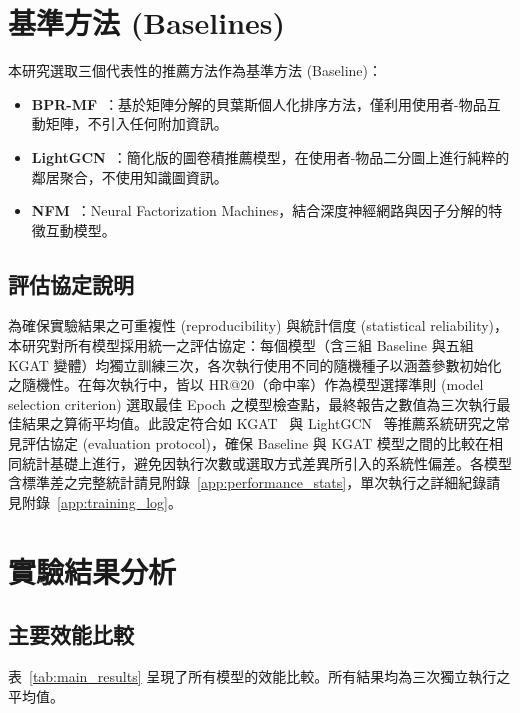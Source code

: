 \section{基準方法 (Baselines)}

本研究選取三個代表性的推薦方法作為基準方法 (Baseline)：

\begin{itemize}[leftmargin=2em]
  \item \textbf{BPR-MF}~\cite{rendle2009bpr}：基於矩陣分解的貝葉斯個人化排序方法，僅利用使用者-物品互動矩陣，不引入任何附加資訊。
  \item \textbf{LightGCN}~\cite{he2020lightgcn}：簡化版的圖卷積推薦模型，在使用者-物品二分圖上進行純粹的鄰居聚合，不使用知識圖資訊。
  \item \textbf{NFM}~\cite{he2017nfm}：Neural Factorization Machines，結合深度神經網路與因子分解的特徵互動模型。
\end{itemize}

\subsection*{評估協定說明}

為確保實驗結果之可重複性 (reproducibility) 與統計信度 (statistical reliability)，本研究對所有模型採用統一之評估協定：每個模型（含三組 Baseline 與五組 KGAT 變體）均獨立訓練三次，各次執行使用不同的隨機種子以涵蓋參數初始化之隨機性。在每次執行中，皆以 HR@20（命中率）作為模型選擇準則 (model selection criterion) 選取最佳 Epoch 之模型檢查點，最終報告之數值為三次執行最佳結果之算術平均值。此設定符合如 KGAT~\cite{wang2019kgat} 與 LightGCN~\cite{he2020lightgcn} 等推薦系統研究之常見評估協定 (evaluation protocol)，確保 Baseline 與 KGAT 模型之間的比較在相同統計基礎上進行，避免因執行次數或選取方式差異所引入的系統性偏差。各模型含標準差之完整統計請見附錄~\ref{app:performance_stats}，單次執行之詳細紀錄請見附錄~\ref{app:training_log}。

\section{實驗結果分析}\label{sec:main_results}

\subsection*{主要效能比較}

表~\ref{tab:main_results} 呈現了所有模型的效能比較。所有結果均為三次獨立執行之平均值。


